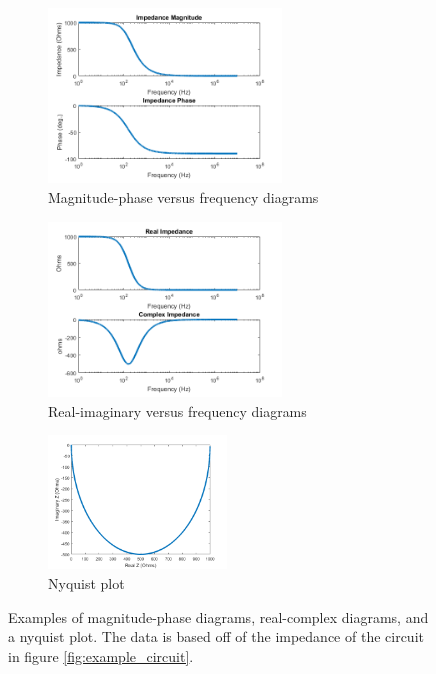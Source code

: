  \begin{figure}
    \centering
    \begin{subfigure}[b]{\textwidth}
        \centering
        \includegraphics[width=0.68\textwidth]{images/magPhaseExample.png}
        \caption{Magnitude-phase versus frequency diagrams}
        \label{fig:mag_phase_ex}
    \end{subfigure}
 
    \begin{subfigure}[b]{\textwidth}
        \centering
        \includegraphics[width=0.68\textwidth]{images/complexRealExample.png}
        \caption{Real-imaginary versus frequency diagrams}
        \label{fig:real_complex_ex}
    \end{subfigure}
    \begin{subfigure}[b]{\textwidth}
        \centering
        \includegraphics[width=0.52\textwidth]{images/nyquistExample.png}
        \caption{Nyquist plot}
        \label{fig:nyquist_plot}
    \end{subfigure}
    \caption[Impedance Diagrams]{Examples of magnitude-phase diagrams, real-complex diagrams, and a nyquist plot. The data is based off of the impedance of the circuit in figure \ref{fig:example_circuit}.}
    \label{fig:impedance_diagrams}
\end{figure}


